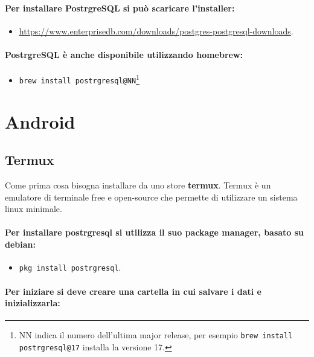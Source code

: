 \paragraph{Per installare PostrgreSQL si può scaricare l'installer:}

\begin{itemize}
  \item \href{https://www.enterprisedb.com/downloads/postgres-postgresql-downloads}{https://www.enterprisedb.com/downloads/postgres-postgresql-downloads}.
\end{itemize}

\paragraph{PostrgreSQL è anche disponibile utilizzando homebrew:}

\begin{itemize}
  \item \texttt{brew install postrgresql@NN}\footnote{NN indica il numero dell'ultima major release, per esempio \texttt{brew install postrgresql@17} installa la versione 17.}
\end{itemize}

\section{Android}


\subsection{Termux}

Come prima cosa bisogna installare da uno store \textbf{termux}. Termux è un emulatore di terminale free e open-source che permette di utilizzare un sistema linux minimale.

\paragraph{Per installare postrgresql si utilizza il suo package manager, basato su debian:}

\begin{itemize}
  \item \texttt{pkg install postrgresql}. 
\end{itemize}

\paragraph{Per iniziare si deve creare una cartella in cui salvare i dati e inizializzarla:}

